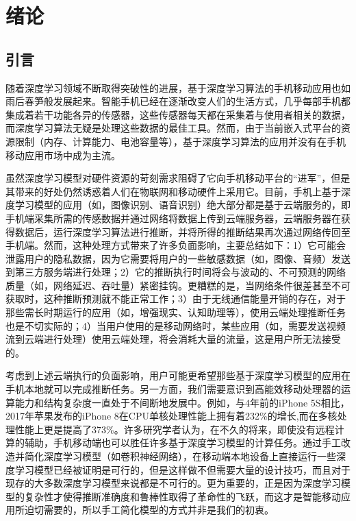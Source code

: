 \chapter{绪论}

\section{引言}
随着深度学习\cite{lecun2015deep}领域不断取得突破性的进展，基于深度学习算法的手机移动应用也如雨后春笋般发展起来。智能手机已经在逐渐改变人们的生活方式，几乎每部手机都集成着若干功能各异的传感器，这些传感器每天都在采集着与使用者相关的数据，而深度学习算法无疑是处理这些数据的最佳工具。然而，由于当前嵌入式平台的资源限制（内存、计算能力、电池容量等），基于深度学习算法的应用并没有在手机移动应用市场中成为主流。

虽然深度学习模型对硬件资源的苛刻需求阻碍了它向手机移动平台的“进军”，但是其带来的好处仍然诱惑着人们在物联网和移动硬件上采用它。目前，手机上基于深度学习模型的应用（如，图像识别、语音识别）绝大部分都是基于云端服务的，即手机端采集所需的传感数据并通过网络将数据上传到云端服务器，云端服务器在获得数据后，运行深度学习算法进行推断，并将所得的推断结果再次通过网络传回至手机端。然而，这种处理方式带来了许多负面影响，主要总结如下：1）它可能会泄露用户的隐私数据，因为它需要将用户的一些敏感数据（如，图像、音频）发送到第三方服务端进行处理；2）它的推断执行时间将会与波动的、不可预测的网络质量（如，网络延迟、吞吐量）紧密挂钩。更糟糕的是，当网络条件很差甚至不可获取时，这种推断预测就不能正常工作；3）由于无线通信能量开销的存在，对于那些需长时期运行的应用（如，增强现实、认知助理等），使用云端处理推断任务也是不切实际的；4）当用户使用的是移动网络时，某些应用（如，需要发送视频流到云端进行处理）使用云端处理，将会消耗大量的流量，这是用户所无法接受的。

考虑到上述云端执行的负面影响，用户可能更希望那些基于深度学习模型的应用在手机本地就可以完成推断任务。另一方面，我们需要意识到高能效移动处理器的运算能力和结构复杂度一直处于不间断地发展中。例如，与4年前的iPhone 5S相比，2017年苹果发布的iPhone 8在CPU单核处理性能上拥有着232\%的增长,而在多核处理性能上更是提高了373\%。许多研究学者认为，在不久的将来，即使没有远程计算的辅助，手机移动端也可以胜任许多基于深度学习模型的计算任务。通过手工改造并简化深度学习模型（如卷积神经网络\cite{krizhevsky2012imagenet}），在移动端本地设备上直接运行一些深度学习模型已经被证明是可行的，但是这样做不但需要大量的设计技巧，而且对于现存的大多数深度学习模型来说都是不可行的。更为重要的，正是因为深度学习模型的复杂性才使得推断准确度和鲁棒性取得了革命性的飞跃，而这才是智能移动应用所迫切需要的，所以手工简化模型的方式并非是我们的初衷。

